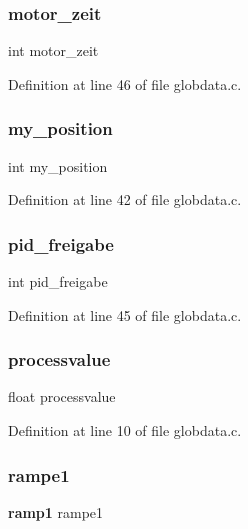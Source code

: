 \subsubsection{motor\+\_\+zeit}
{\footnotesize\ttfamily int motor\+\_\+zeit}



Definition at line 46 of file globdata.\+c.

\mbox{\label{globdata_8c_ae986bf1cc8384f284082d88d4d207bd2}} 
\subsubsection{my\+\_\+position}
{\footnotesize\ttfamily int my\+\_\+position}



Definition at line 42 of file globdata.\+c.

\mbox{\label{globdata_8c_a0cabdc83b07713ce7646feafad85a4c3}} 
\subsubsection{pid\+\_\+freigabe}
{\footnotesize\ttfamily int pid\+\_\+freigabe}



Definition at line 45 of file globdata.\+c.

\mbox{\label{globdata_8c_a94a90c1796eac371dd8d0c891eab98f4}} 
\subsubsection{processvalue}
{\footnotesize\ttfamily float processvalue}



Definition at line 10 of file globdata.\+c.

\mbox{\label{globdata_8c_adb61eaefb6edebc63458366696c69057}} 
\subsubsection{rampe1}
{\footnotesize\ttfamily \textbf{ ramp1} rampe1}



